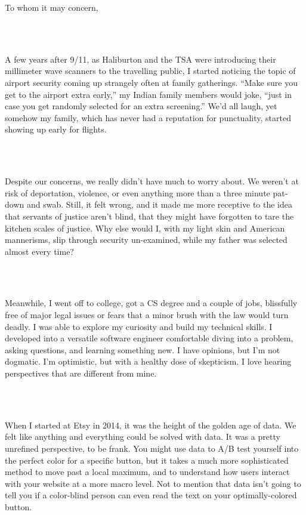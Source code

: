 \documentclass[9pt]{developercv} %
\begin{document}
\parbox{1\textwidth}{To whom it may concern,}\\
\vspace{0.5cm}\\
\parbox{1\textwidth}{\hspace{0.75cm}A few years after 9/11, as Haliburton and the TSA were introducing their millimeter wave scanners to the travelling public, I started noticing the topic of airport security coming up strangely often at family gatherings. “Make sure you get to the airport extra early,” my Indian family members would joke, “just in case you get randomly selected for an extra screening.” We’d all laugh, yet somehow my family, which has never had a reputation for punctuality, started showing up early for flights.}\\
\vspace{0.25cm}\\
\parbox{1\textwidth}{\hspace{0.75cm}Despite our concerns, we really didn’t have much to worry about. We weren’t at risk of deportation, violence, or even anything more than a three minute pat-down and swab. Still, it felt wrong, and it made me more receptive to the idea that servants of justice aren’t blind, that they might have forgotten to tare the kitchen scales of justice. Why else would I, with my light skin and American mannerisms, slip through security un-examined, while my father was selected almost every time?}\\
\vspace{0.25cm}\\
\parbox{1\textwidth}{\hspace{0.75cm}Meanwhile, I went off to college, got a CS degree and a couple of jobs, blissfully free of major legal issues or fears that a minor brush with the law would turn deadly. I was able to explore my curiosity and build my technical skills. I developed into a versatile software engineer comfortable diving into a problem, asking questions, and learning something new. I have opinions, but I’m not dogmatic. I’m optimistic, but with a healthy dose of skepticism. I love hearing perspectives that are different from mine.}\\
\vspace{0.25cm}\\
\parbox{1\textwidth}{\hspace{0.75cm}When I started at Etsy in 2014, it was the height of the golden age of data. We felt like anything and everything could be solved with data. It was a pretty unrefined perspective, to be frank. You might use data to A/B test yourself into the perfect color for a specific button, but it takes a much more sophisticated method to move past a local maximum, and to understand how users interact with your website at a more macro level. Not to mention that data isn’t going to tell you if a color-blind person can even read the text on your optimally-colored button.}\\
\end{document}
